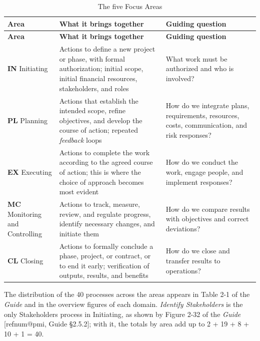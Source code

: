 \documentclass[12pt,a4paper,article,oneside,brazil,english]{abntex2}
\makeatletter
\newcommand{\fontetab}[1]{\par\vspace{3pt}{\small\noindent Source: #1\par}}
\newcommand{\refnum}[1]{\csname refnum@#1\endcsname}
\newcommand{\cit}[1]{[\refnum{#1}]}
\makeatother
\begin{document}
\begingroup\SingleSpacing\small
\begin{longtable}{@{}>{\raggedright\arraybackslash}p{}>{\raggedright\arraybackslash}p{}>{\raggedright\arraybackslash}p{}@{}}
\caption{The five Focus Areas}\label{tab:t6}\\
\hline
\textbf{Area} & \textbf{What it brings together} & \textbf{Guiding question}\\
\hline
\endfirsthead
\hline
\textbf{Area} & \textbf{What it brings together} & \textbf{Guiding question}\\
\hline
\endhead
\hline
\endfoot
\hline
\endlastfoot
\textbf{IN} Initiating & Actions to define a new project or phase, with formal authorization; initial scope, initial financial resources, stakeholders, and roles & What work must be authorized and who is involved?\\[3pt]
\textbf{PL} Planning & Actions that establish the intended scope, refine objectives, and develop the course of action; repeated \textit{feedback} loops & How do we integrate plans, requirements, resources, costs, communication, and risk responses?\\[3pt]
\textbf{EX} Executing & Actions to complete the work according to the agreed course of action; this is where the choice of approach becomes most evident & How do we conduct the work, engage people, and implement responses?\\[3pt]
\textbf{MC} Monitoring and Controlling & Actions to track, measure, review, and regulate progress, identify necessary changes, and initiate them & How do we compare results with objectives and correct deviations?\\[3pt]
\textbf{CL} Closing & Actions to formally conclude a phase, project, or contract, or to end it early; verification of outputs, results, and benefits & How do we close and transfer results to operations?\\[3pt]
\end{longtable}
\endgroup
\fontetab{Prepared by the authors (2026), based on \cit{pmi}.}

The distribution of the 40 processes across the areas appears in Table 2-1 of the \textit{Guide} and in the overview figures of each domain. \textit{Identify Stakeholders} is the only Stakeholders process in Initiating, as shown by Figure 2-32 of the \textit{Guide} [\refnum{pmi}, Guide §2.5.2]; with it, the totals by area add up to 2 + 19 + 8 + 10 + 1 = 40.
\end{document}
